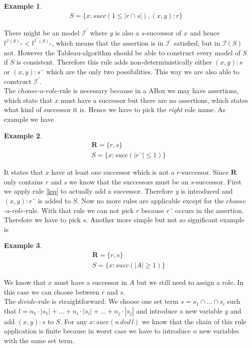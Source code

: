\documentclass[a4paper,11pt]{scrartcl}
\theoremstyle{break}
\theoremstyle{definition}
\newtheorem{ex}{Example}
\begin{document}
\begin{ex}
\begin{align*}
S=\{x:succ(1\leq|r\cap s|), (x,y):r\}
\end{align*}
\end{ex}
There might be an model $\mathcal{I^\prime}$ where $y$ is also a $s$-successor of $x$ and hence $l^{\mathcal{I}(S)_x}<l^{\mathcal{I}^\prime(S)_x}$, which means that the assertion is in $\mathcal{I}^\prime$ satisfied, but in $\mathcal{I}(S)$ not. However the Tableau-algorithm should be able to construct every model of $S$ if $S$ is consistent. Therefore this rule adds non-deterministically either $(x,y):s$ or $(x,y):s^\neg$ which are the only two possibilities. This way we are also able to construct $\mathcal{I^\prime}$.\\
The $choose$-$a$-$role$-rule is necessary because in a ABox we may have assertions, which state that $x$ must have a successor but there are no assertions, which states what kind of successor it is. Hence we have to pick the \textit{right} role name. As example we have
\begin{ex}
\begin{align*}
&\mathbf{R}=\{r,s\}\\
&S=\{x:succ(|r^\neg|\leq 1)\}
\end{align*} 
\end{ex}
It states that $x$ have at least one successor which is not a $r$-successor. Since $\mathbf{R}$ only contains $r$ and $s$ we know that the successors must be an $s$-successor. First we apply rule \ref{leq} to actually add a successor. Therefore $y$ is introduced and $(x,y):r^\neg$ is added to $S$. Now no more rules are applicable except for the $choose$-$a$-$role$-rule. With that rule we can not pick $r$ because $r^\neg$ occurs in the assertion. Therefore we have to pick $s$. Another more simple but not so significant example is
\begin{ex}
\begin{align*}
&\mathbf{R}=\{r,s\}\\
&S=\{x:succ(|A|\geq 1)\}
\end{align*} 
\end{ex}
We know that $x$ must have a successor in $A$ but we still need to assign a role. In this case we can choose between $r$ and $s$.
\\
The $divide$-rule is straightforward: We choose one set term $s=s_1\cap\dots\cap s_i$ such that $l=n_1\cdot|s_1|+\dots+n_i\cdot|s_i|+\dots+n_j\cdot|s_j|$ and introduce a new variable $y$ and add $(x,y):s$ to $S$. For any $x:succ(n\,dvd\,l)$ we know that the chain of this rule application is finite because in worst case we have to introduce $n$ new variables with the same set term.
\end{document}

